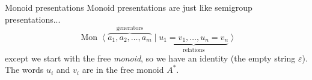 \documentclass[]{beamer}
\let\epsilon\varepsilon
\newcommand{\Mon}{\operatorname{Mon}\;}
\begin{document}
\begin{frame}{Monoid presentations}
	Monoid presentations are just like semigroup presentations...
	\[
		\Mon \langle \; \overbrace{a_1, a_2, \ldots, a_m}^{\text{generators}}
			\mid 
			\underbrace{u_1 = v_1, \ldots, u_n = v_n}_{\text{relations}} \;
			\rangle
	\]
	except we start with the free \emph{monoid}, so we have an identity (the empty string $\epsilon$). The words $u_i$ and $v_i$ are in the free monoid $A^*$.

\end{frame}

\end{document}
